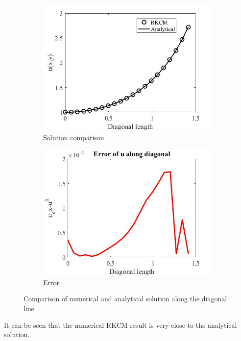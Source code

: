 \documentclass[11pt, letterpaper]{article}
\begin{document}
\begin{figure}[H]
\centering
\begin{subfigure}{.5\textwidth}
  \centering
  \includegraphics[width=0.97\linewidth]{images/3.jpg}
  \caption{Solution comparison}
  \label{fig3-1}
\end{subfigure}%
\begin{subfigure}{.5\textwidth}
  \centering
  \includegraphics[width=0.97\linewidth]{images/4.jpg}
  \caption{Error}
  \label{fig3-2}
\end{subfigure}
\caption{Comparison of numerical and analytical solution along the diagonal line}
\label{fig3}
\end{figure}



It can be seen that the numerical RKCM result is very close to the analytical solution. 
\end{document}
